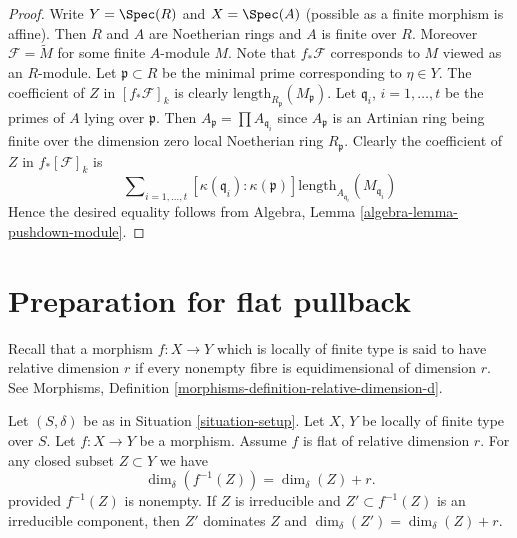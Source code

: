 \begin{proof}
\medskip\noindent
Write $Y = \Spec(R)$ and $X = \Spec(A)$ (possible as
a finite morphism is affine).
Then $R$ and $A$ are Noetherian rings and $A$ is finite over $R$.
Moreover $\mathcal{F} = \widetilde{M}$ for some finite $A$-module
$M$. Note that $f_*\mathcal{F}$ corresponds to $M$ viewed as an $R$-module.
Let $\mathfrak p \subset R$ be the minimal prime corresponding
to $\eta \in Y$. The coefficient of $Z$ in $[f_*\mathcal{F}]_k$
is clearly $\text{length}_{R_{\mathfrak p}}(M_{\mathfrak p})$.
Let $\mathfrak q_i$, $i = 1, \ldots, t$ be the primes of $A$
lying over $\mathfrak p$. Then $A_{\mathfrak p} = \prod A_{\mathfrak q_i}$
since $A_{\mathfrak p}$ is an Artinian ring being finite over the
dimension zero local Noetherian ring $R_{\mathfrak p}$.
Clearly the coefficient of $Z$ in $f_*[\mathcal{F}]_k$ is
$$
\sum\nolimits_{i = 1, \ldots, t}
[\kappa(\mathfrak q_i) : \kappa(\mathfrak p)]
\text{length}_{A_{\mathfrak q_i}}(M_{\mathfrak q_i})
$$
Hence the desired equality follows from
Algebra, Lemma \ref{algebra-lemma-pushdown-module}.
\end{proof}




















\section{Preparation for flat pullback}
\label{section-preparation-flat-pullback}


\noindent
Recall that a morphism $f : X \to Y$ which is locally of finite type
is said to have relative dimension $r$ if every nonempty fibre
is equidimensional of dimension $r$. See
Morphisms, Definition \ref{morphisms-definition-relative-dimension-d}.

\begin{lemma}
\label{lemma-flat-inverse-image-dimension}
Let $(S, \delta)$ be as in Situation \ref{situation-setup}.
Let $X$, $Y$ be locally of finite type over $S$.
Let $f : X \to Y$ be a morphism.
Assume $f$ is flat of relative dimension $r$.
For any closed subset $Z \subset Y$ we have
$$
\dim_\delta(f^{-1}(Z)) = \dim_\delta(Z) + r.
$$
provided $f^{-1}(Z)$ is nonempty.
If $Z$ is irreducible and $Z' \subset f^{-1}(Z)$ is an irreducible
component, then $Z'$ dominates $Z$ and
$\dim_\delta(Z') = \dim_\delta(Z) + r$.
\end{lemma}

